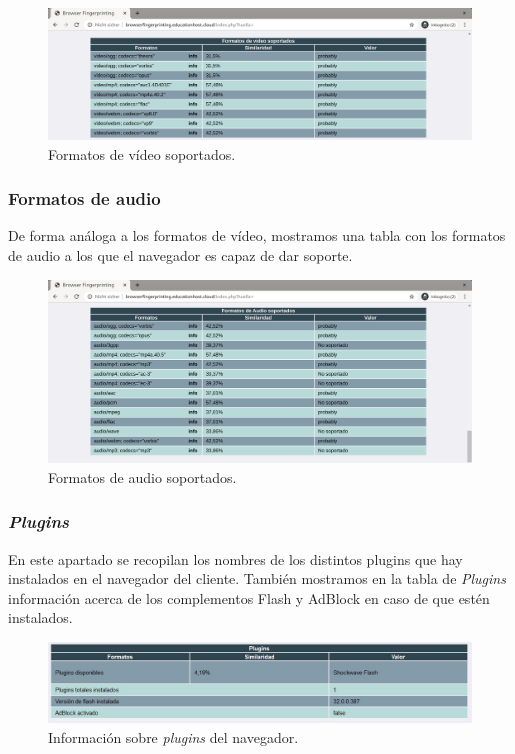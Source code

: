 \begin{figure}[H]
	\centering
	\includegraphics[width=1\textwidth]{Images/videosSection.png}
	\caption{Formatos de vídeo soportados.}
	\label{fig:videosSection}
\end{figure}

\subsubsection{Formatos de audio}
De forma análoga a los formatos de vídeo, mostramos una tabla con los formatos de audio a los que el navegador es capaz de dar soporte.

\begin{figure}[H]
	\centering
	\includegraphics[width=1\textwidth]{Images/audiosSection.png}
	\caption{Formatos de audio soportados.}
	\label{fig:audiosSection}
\end{figure}

\subsubsection{\textit{Plugins}}
En este apartado se recopilan los nombres de los distintos plugins que hay instalados en el navegador del cliente. También mostramos en la tabla de \textit{Plugins} información acerca de los complementos Flash y AdBlock en caso de que estén instalados.

\begin{figure}[H]
	\centering
	\includegraphics[width=1\textwidth]{Images/pluginsSection.jpg}
	\caption{Información sobre \textit{plugins} del navegador.}
	\label{fig:pluginsSection}
\end{figure}

